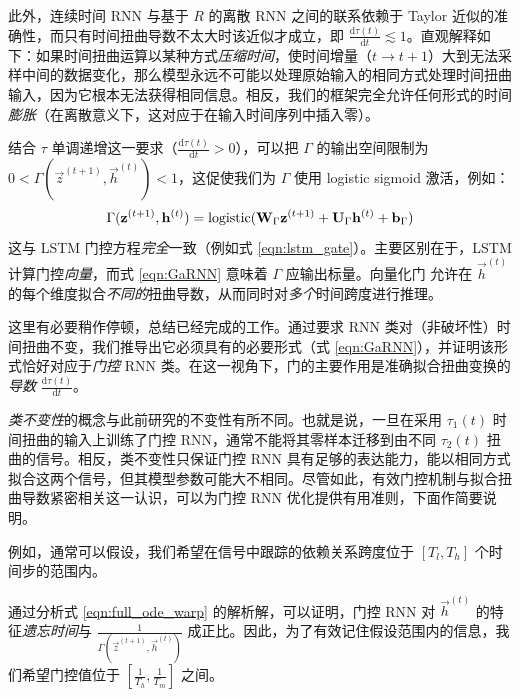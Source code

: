 此外，连续时间 RNN 与基于 $R$ 的离散 RNN 之间的联系依赖于 Taylor 近似的准确性，而只有时间扭曲导数不太大时该近似才成立，即 $\frac{\mathrm{d}\tau(t)}{\mathrm{d}t}\lesssim 1$。直观解释如下：如果时间扭曲运算以某种方式\emph{压缩时间}，使时间增量（$t \rightarrow t + 1$）大到无法采样中间的数据变化，那么模型永远不可能以处理原始输入的相同方式处理时间扭曲输入，因为它根本无法获得相同信息。相反，我们的框架完全允许任何形式的时间\emph{膨胀}（在离散意义下，这对应于在输入时间序列中插入零）。

结合 $\tau$ 单调递增这一要求（$\frac{\mathrm{d}\tau(t)}{\mathrm{d}t} > 0$），可以把 $\Gamma$ 的输出空间限制为 $0 < \Gamma(\vec{z}^{(t+1)}, \vec{h}^{(t)}) < 1$，这促使我们为 $\Gamma$ 使用 logistic sigmoid 激活，例如：
$$
    \Gamma(\vec{z}^{(t+1)}, \vec{h}^{(t)}) = \mathrm{logistic}({\bf W}_\Gamma\vec{z}^{(t+1)} + {\bf U}_\Gamma\vec{h}^{(t)} + \vec{b}_\Gamma)
$$
这与 LSTM 门控方程\emph{完全}一致（例如式 \ref{eqn:lstm_gate}）。主要区别在于，LSTM 计算门控\emph{向量}，而式 \ref{eqn:GaRNN} 意味着 $\Gamma$ 应输出标量。向量化门 \citep{hochreiter1991untersuchungen} 允许在 $\vec{h}^{(t)}$ 的每个维度拟合\emph{不同的}扭曲导数，从而同时对\emph{多个}时间跨度进行推理。

这里有必要稍作停顿，总结已经完成的工作。通过要求 RNN 类对（非破坏性）时间扭曲不变，我们推导出它必须具有的必要形式（式 \ref{eqn:GaRNN}），并证明该形式恰好对应于\emph{门控} RNN 类。在这一视角下，门的主要作用是准确拟合扭曲变换的\emph{导数} $\frac{\mathrm{d}\tau(t)}{\mathrm{d}t}$。

\emph{类不变性}的概念与此前研究的不变性有所不同。也就是说，一旦在采用 $\tau_1(t)$ 时间扭曲的输入上训练了门控 RNN，通常不能将其零样本迁移到由不同 $\tau_2(t)$ 扭曲的信号。相反，类不变性只保证门控 RNN 具有足够的表达能力，能以相同方式拟合这两个信号，但其模型参数可能大不相同。尽管如此，有效门控机制与拟合扭曲导数紧密相关这一认识，可以为门控 RNN 优化提供有用准则，下面作简要说明。

例如，通常可以假设，我们希望在信号中跟踪的依赖关系跨度位于 $[T_l, T_h]$ 个时间步的范围内。

通过分析式 \ref{eqn:full_ode_warp} 的解析解，可以证明，门控 RNN 对 $\vec{h}^{(t)}$ 的特征\emph{遗忘时间}与 $\frac{1}{\Gamma(\vec{z}^{(t+1)}, \vec{h}^{(t)})}$ 成正比。因此，为了有效记住假设范围内的信息，我们希望门控值位于 $\left[\frac{1}{T_h}, \frac{1}{T_m}\right]$ 之间。

